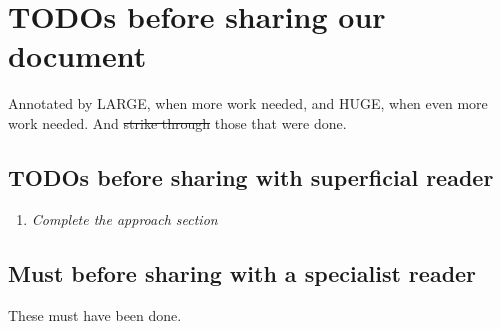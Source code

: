 \documentclass[acmsmall,review,anonymous]{acmart}\settopmatter{printfolios=true}
\begin{document}
\section{TODOs before sharing our document}

Annotated by LARGE, when more work needed, and HUGE, when even more work needed.
 And \st{strike through} those that were done.
 
\subsection{TODOs before sharing with superficial reader}

 
\begin{enumerate}
\item
\sl{Complete the approach section}
\end{enumerate}
 
 \subsection{Must before sharing with a specialist reader}
 These must have been done.  
 
\end{document}
